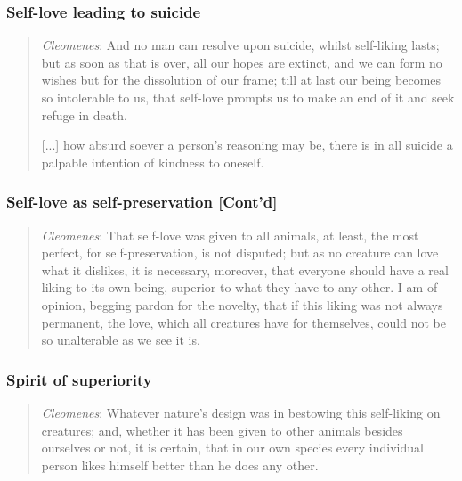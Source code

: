        \subsubsection{Self-love leading to suicide}

            \begin{quote}
                \textit{Cleomenes}: And no man can resolve upon suicide, whilst self-liking lasts; but as soon as that is over, all our hopes are extinct, and we can form no wishes but for the dissolution of our frame; till at last our being becomes so intolerable to us, that self-love prompts us to make an end of it and seek refuge in death.
                
                [...] how absurd soever a person’s reasoning may be, there is in all suicide a palpable intention of kindness to oneself.
            \end{quote}

        \subsubsection{Self-love as self-preservation [Cont'd]}

            \begin{quote}
                \textit{Cleomenes}: That self-love was given to all animals, at least, the most perfect, for self-preservation, is not disputed; but as no creature can love what it dislikes, it is necessary, moreover, that everyone should have a real liking to its own being, superior to what they have to any other. I am of opinion, begging pardon for the novelty, that if this liking was not always permanent, the love, which all creatures have for themselves, could not be so unalterable as we see it is.    
            \end{quote}

        \subsubsection{Spirit of superiority}

            \begin{quote}
                \textit{Cleomenes}: Whatever nature’s design was in bestowing this self-liking on creatures; and, whether it has been given to other animals besides ourselves or not, it is certain, that in our own species every individual person likes himself better than he does any other.
            \end{quote}

